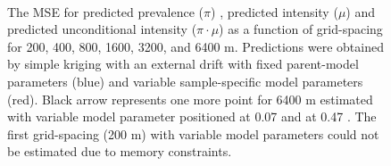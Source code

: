 \documentclass[review]{elsarticle}
\begin{document}
\begin{figure}[htbp]
\quad
{}\quad
{}\\
\caption{The MSE for predicted prevalence ($\pi$) \protect{}, predicted intensity ($\mu$) \protect{} and predicted unconditional intensity ($\pi \cdot \mu$) \protect{} as a function of grid-spacing for 200, 400, 800, 1600, 3200, and 6400 m. Predictions were obtained by simple kriging with an external drift with fixed parent-model parameters (blue) and variable sample-specific model parameters (red). Black arrow represents  one more point for 6400 m estimated with variable model parameter positioned at 0.07 \protect{} and at 0.47 \protect{}. The first grid-spacing (200 m) with variable model parameters could not be estimated due to memory constraints.}
\label{fig:mse}
\end{figure}
\end{document}
